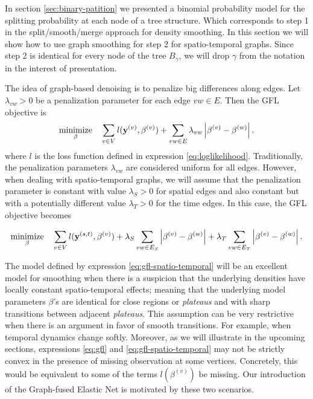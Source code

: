 \documentclass[a4paper, 11pt]{article}
\begin{document}
In section \ref{sec:binary-patition} we presented a binomial probability model for the splitting probability at each node of a tree structure. Which corresponds to step 1 in the split/smooth/merge approach for density smoothing. In this section we will show how to use graph smoothing for step 2 for spatio-temporal graphs. Since step 2 is identical for every node of the tree $B_\gamma$, we will drop $\gamma$ from the notation in the interest of presentation. 

The idea of graph-based denoising is to penalize big differences along edges. Let $\lambda_{vw} > 0$ be a penalization parameter for each edge $vw \in E$. Then the GFL objective is
\begin{equation}\label{eq:gfl}
\begin{aligned}
\operatornamewithlimits{minimize}_{\beta} \quad \sum_{v \in V} l(\mathbf{y}^{(v)}, \beta^{(v)} ) + \sum_{vw\in E} \lambda_{vw} \left\lvert \beta^{(v)} - \beta^{(w)}\right\rvert.
\end{aligned}    
\end{equation}
where $l$ is the loss function defined in expression \eqref{eq:loglikelihood}. Traditionally, the penalization parameters $\lambda_{vw}$ are considered uniform for all edges. However, when dealing with spatio-temporal graphs, we will assume that the penalization parameter is constant with value $\lambda_S>0$ for spatial edges and also constant but with a potentially different value $\lambda_T>0$ for the time edges. In this case, the GFL objective becomes 

\begin{equation}\label{eq:gfl-spatio-temporal}
\begin{aligned}
\operatornamewithlimits{minimize}_{\beta} \quad \sum_{v \in V} l(\mathbf{y}^{(s,t)}, \beta^{(v)}) + \lambda_S \sum_{vw\in E_S} \left\lvert \beta^{(v)} - \beta^{(w)}\right\rvert + \lambda_T \sum_{vw\in E_T} \left\lvert \beta^{(v)} - \beta^{(w)}\right\rvert.
\end{aligned}    
\end{equation}


The model defined by expression \eqref{eq:gfl-spatio-temporal} will be an excellent model for smoothing when there is a suspicion that the underlying densities have locally constant spatio-temporal effects; meaning that the underlying model parameters $\beta$'s are identical for close regions or \textit{plateaus} and with sharp transitions between adjacent \textit{plateaus}. This assumption can be very restrictive when there is an argument in favor of smooth transitions. For example, when temporal dynamics change softly. Moreover, as we will illustrate in the upcoming sections, expressions \eqref{eq:gfl} and \eqref{eq:gfl-spatio-temporal} may not be strictly convex in the presence of missing observation at some vertices. Concretely, this would be equivalent to some of the terms $l(\beta^{(v)})$ be missing. Our introduction of the Graph-fused Elastic Net is motivated by these two scenarios.
        
\end{document}
